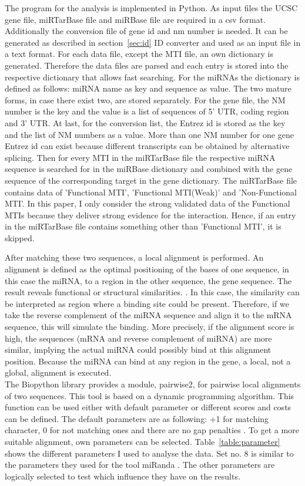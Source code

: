 \documentclass[12pt]{article}
\begin{document}
The program for the analysis is implemented in Python. As input files the UCSC gene file, miRTarBase file and miRBase file are required in a csv format. Additionally the conversion file of gene id and nm number is needed. It can be generated as described in section~\ref{sec:id} ID converter and used as an input file in a text format. 
For each data file, except the MTI file, an own dictionary is generated. Therefore the data files are parsed and each entry is stored into the respective dictionary that allows fast searching. For the miRNAs the dictionary is defined as follows: miRNA name as key and sequence as value. The two mature forms, in case there exist two, are stored separately. For the gene file, the NM number is the key and the value is a list of sequences of 5' UTR, coding region and 3' UTR. At last, for the conversion list, the Entrez id is stored as the key and the list of NM numbers as a value. More than one NM number for one gene Entrez id can exist because different transcripts can be obtained by alternative splicing. 
Then for every MTI in the miRTarBase file the respective miRNA sequence is searched for in the miRBase dictionary and combined with the gene sequence of the corresponding target in the gene dictionary. The miRTarBase file contains data of 'Functional MTI', 'Functional MTI(Weak)' and 'Non-Functional MTI'. In this paper, I only consider the strong validated data of the Functional MTIs because they deliver strong evidence for the interaction. Hence, if an entry in the miRTarBase file contains something other than 'Functional MTI', it is skipped.

After matching these two sequences, a local alignment is performed. An alignment is defined as the optimal positioning of the bases of one sequence, in this case the miRNA, to a region in the other sequence, the gene sequence. The result reveals functional or structural similarities. \cite{alignment}. In this case, the similarity can be interpreted as region where a binding site could be present. Therefore, if we take the reverse complement of the miRNA sequence and align it to the mRNA sequence, this will simulate the binding. More precisely, if the alignment score is high, the sequences (mRNA and reverse complement of miRNA) are more similar, implying the actual miRNA could possibly bind at this alignment position. Because the miRNA can bind at any region in the gene, a local, not a global, alignment is executed.\\

The Biopython library provides a module, pairwise2, for pairwise local alignments of two sequences. This tool is based on a dynamic programming algorithm. This function can be used either with default parameter or different scores and costs can be defined. The default parameters are as following: +1 for matching character, 0 for not matching ones and there are no gap penalties \cite{pairwise}. To get a more suitable alignment, own parameters can be selected. Table~\ref{table:parameter} shows the different parameters I used to analyse the data. Set no. 8 is similar to the parameters they used for the tool miRanda \cite{Enright}. The other parameters are logically selected to test which influence they have on the results.
\end{document}
